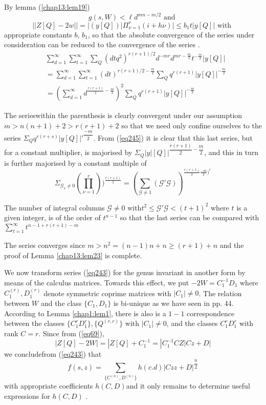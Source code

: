 By lemma (\ref{chap13:lem19})
$$
g (s , W) < \ell d ^{mn - m/2} \text{ and } 
$$
$$
|| Z[Q] - 2w || = | (y [Q])| \Pi ^r _{\nu = 1} ( i + h \nu) |
\leq b_1 t |y[Q]| \text{ with } 
$$
appropriate constants $b$, $b_1$, so that the absolute convergence
of the series under consideration can be reduced to the convergence of
the series .  
\begin{align*}
& \sum^{\infty}_{d=1} \sum^{\infty}_{t=1} \sum_Q (dt q^2)^{r(r+1)/2}
  d^{-mr} d^{mr - \frac{m}{2}} t^{-\frac{m}{2}} |y[Q]|\\
& = \sum^\infty_{d=1} \sum^{\infty}_{t=1} (dt)^{r(r+1)/2-\frac{m}{2}}
  \sum_Q q^{r(r+1)} |y[Q]|^{-\frac{m}{2}}\\
& = \left(\sum^{\infty}_{d=1} d^{\frac{r(r+1)}{2} - \frac{m}{2}}
  \right)^2 \sum_Q q^{r(r+1)} |y[Q]|^{-\frac{m}{2}}
\end{align*}

The series\pageoriginale within the parenthesis is clearly convergent
under our 
assumption $m > n ( n + 1) + 2 > r (r +1 ) + 2$ so that we need only
confine ourselves to the series $\Sigma_{Q} q^{ r(r + s)} | y
[Q]|'^{\dfrac{-m}{2}}$. From (\ref{eq245}) it is clear that this last
series, but for a constant multiplier, is majorised by
$\Sigma_{Q}|y|{[Q]}|^{ \dfrac{r (r +1)}{2}- \dfrac{m}{2}}$, and this
in turn is further majorised by a constant multiple of  
$$
\Sigma_{\mathscr{G}_\nu \neq 0} (\prod ^r _{\nu = 1 }))^ {\frac{ r( r
    + 1 )}{2} } = (\sum_{\mathscr{G} \neq 1}
(\mathscr{G'}\mathscr{G}))^{ \frac{r(r+1)}{2}\frac{-m}{2})^r} 
$$

The number of integral columns $\mathscr{G} \neq 0$ with$t^2 \leq
\mathscr{G'}\mathscr{G} < (t + 1)^2$ where $t$ is a given integer, is
of the order of $t^{n - 1}$ so that the last series can be compared
with $\sum_{t = 1}^{\infty} t^{ n - 1 + r( r + 1) - m}$  

The series converges since $ m >n^2 = ( n - 1) n + n \geq (r + 1) + n
$ and the proof of Lemma \ref{chap13:lem23} is complete.  

We now transform series (\ref{eq243}) for the genus invariant in another
form by means of the calculus matrices. Towards this effect, we put $
- 2 W = C^{-1}_1 D_1$ where $C^{(r)}_1, D^{(r)}_1$ denote symmetric
coprime matrices with $|C_1| \neq 0$. The relation between $W$ and the
class $\{C_1, D_1\}$ is bi-unique as we have seen in pp. 44. According
to Lemma \ref{chap1:lem1}, there is also is a $1 - 1$ 
correspondence between the classes $\big\{ C^{r}_1 D^{r}_1\big \} ,
\big\{ Q^{(r , r)}\big\}$ with $|C_1| \neq 0$, and the classes
$C^{r}_1 D^{r}_1$ with rank $C = r$. Since from (\ref{eq69}),  
\begin{equation*} 
|Z[Q] - 2 W | = |Z[Q] + C^{-1}_1 = |C_1^{-1} CZ | Cz +
D|\tag{246}\label{eq246}   
\end{equation*}
we conclude\pageoriginale from (\ref{eq243}) that
$$ 
f(s , z) =\sum\limits_{\big\{ C^{(n)}, D^{(n)} \big\}} h (c. d) | Czz
+D |^{\dfrac{n}{2}}
$$  
with appropriate coefficients $h(C , D)$and it only remains to
determine useful expressions for $h (C, D)$ .  

